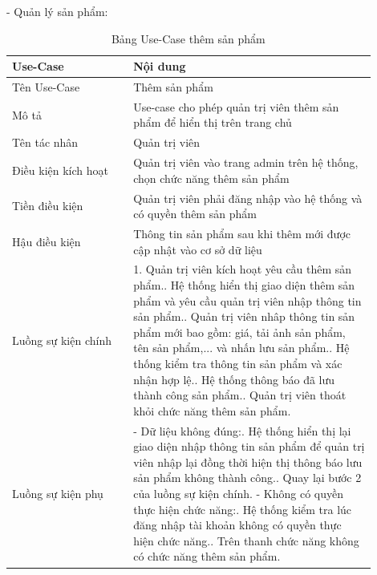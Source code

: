 - Quản lý sản phẩm:
\begin{longtable}[htp]{ |m{0.3\linewidth}|m{0.6\linewidth}|}
 \caption{Bảng Use-Case thêm sản phẩm \label{createProduct}}\\
 \hline
 Use-Case & Nội dung \\
 \hline
 Tên Use-Case & Thêm sản phẩm \\
 \hline
 Mô tả & Use-case cho phép quản trị viên thêm sản phẩm để hiển thị trên trang chủ\\
 \hline
 Tên tác nhân & Quản trị viên\\
 \hline
 Điều kiện kích hoạt & Quản trị viên vào trang admin trên hệ thống, chọn chức năng thêm sản phẩm\\
 \hline
 Tiền điều kiện & Quản trị viên phải đăng nhập vào hệ thống và có quyền thêm sản phẩm\\
 \hline
 Hậu điều kiện & Thông tin sản phẩm sau khi thêm mới được cập nhật vào cơ sở dữ liệu\\
 \hline
 Luồng sự kiện chính & 
 1. Quản trị viên kích hoạt yêu cầu thêm sản phẩm.\newline
 2. Hệ thống hiển thị giao diện thêm sản phẩm và yêu cầu quản trị viên nhập thông tin sản phẩm.\newline
 3. Quản trị viên nhâp thông tin sản phẩm mới bao gồm: giá, tải ảnh sản phẩm, tên sản phẩm,... và nhấn lưu sản phẩm.\newline
 4. Hệ thống kiểm tra thông tin sản phẩm và xác nhận hợp lệ.\newline
 5. Hệ thống thông báo đã lưu thành công sản phẩm.\newline	
 6. Quản trị viên thoát khỏi chức năng thêm sản phẩm.
 \\
 \hline
 Luồng sự kiện phụ & 
 - Dữ liệu không đúng:\newline
  1. Hệ thống hiển thị lại giao diện nhập thông tin sản phẩm để quản trị viên nhập lại đồng thời hiện thị thông báo lưu sản phẩm không thành công.\newline
  2. Quay lại bước 2 của luồng sự kiện chính.\newline
  - Không có quyền thực hiện chức năng:\newline
  1. Hệ thống kiểm tra lúc đăng nhập tài khoản không có quyền thực hiện chức năng.\newline
  2. Trên thanh chức năng không có chức năng thêm sản phẩm.
 \\
 \hline
\end{longtable}

